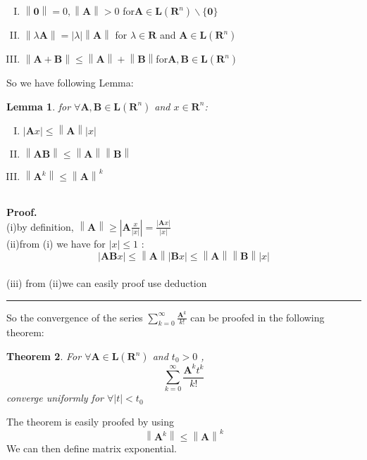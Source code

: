 \documentclass[a4paper]{article}
\newtheorem{theorem}{Theorem}
\newtheorem{lemma}[theorem]{Lemma}
\newenvironment{proof}[1][Proof]{\textbf{#1.} }{\ \rule{0.5em}{0.5em}}
\newenvironment{enumerateromancap}{\begin{enumerate}[I.] }{\end{enumerate}}
\begin{document}
\begin{enumerateromancap}
  \item $\left\| \mathbf{0} \right\|=0,\left\| \mathbf{A} \right\|>0$ for$\mathbf{A}\in \mathbf{L}({{\mathbf{R}}^{n}})\backslash \{\mathbf{0}\}$
  \item $\left\| \lambda \mathbf{A} \right\|=\left| \lambda  \right|\left\| \mathbf{A} \right\|$ for $\lambda \in \mathbf{R}$ and $\mathbf{A}\in \mathbf{L}({{\mathbf{R}}^{n}})$
  \item $\left\| \mathbf{A+B} \right\|\le \left\| \mathbf{A} \right\|+\left\| \mathbf{B} \right\|$for$\mathbf{A},\mathbf{B}\in \mathbf{L}({{\mathbf{R}}^{n}})$
\end{enumerateromancap}

So we have following Lemma:
\begin{lemma}
for $\forall \mathbf{A},\mathbf{B}\in \mathbf{L}({{\mathbf{R}}^{n}})$ and $x\in {{\mathbf{R}}^{n}}$:
\begin{enumerateromancap}
  \item $\left| \mathbf{A}x \right|\le \left\| \mathbf{A} \right\|\left| x \right|$
  \item $\left\| \mathbf{AB} \right\|\le \left\| \mathbf{A} \right\|\left\| \mathbf{B} \right\|$
  \item $\left\| {{\mathbf{A}}^{k}} \right\|\le {{\left\| \mathbf{A} \right\|}^{k}}$
\end{enumerateromancap}
\end{lemma}
\ \\
\begin{proof}\\
(i)by definition,
$\left\| \mathbf{A} \right\|\ge \left| \mathbf{A}\frac{x}{\left| x \right|} \right|=\frac{\left| \mathbf{A}x \right|}{\left| x \right|}$\\
(ii)from (i) we have for $\left| x \right|\le 1$ :
\[\left| \mathbf{AB}x \right|\le \left\| \mathbf{A} \right\|\left| \mathbf{B}x \right|\le \left\| \mathbf{A} \right\|\left\| \mathbf{B} \right\|\left| x \right|\]\\
(iii) from (ii)we can easily proof use deduction
\end{proof}

So the convergence of the series $\sum\limits_{k=0}^{\infty }{\frac{{{\mathbf{A}}^{k}}}{k!}}$ can be proofed in the following theorem:
\begin{theorem}
\label{convergence_of_exp(A)}
For $\forall \mathbf{A}\in \mathbf{L}({{\mathbf{R}}^{n}})$ and ${{t}_{0}}>0$ , \[\sum\limits_{k=0}^{\infty }{\frac{{{\mathbf{A}}^{k}}{{t}^{k}}}{k!}}\]converge uniformly for $\forall \left| t \right|<{{t}_{0}}$
\end{theorem}
The theorem is easily proofed by using \[\left\| {{\mathbf{A}}^{k}} \right\|\le {{\left\| \mathbf{A} \right\|}^{k}}\]
We can then define matrix exponential.
\end{document}
